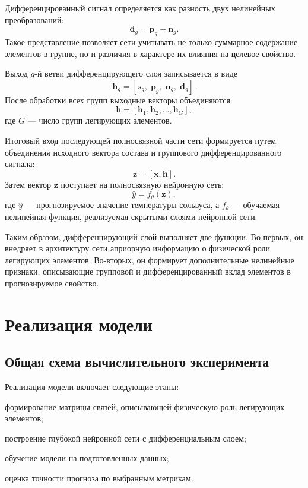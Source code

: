 Дифференцированный сигнал определяется как разность двух нелинейных
преобразований:
$$\mathbf{d}_g =\mathbf{p}_g - \mathbf{n}_g.$$
Такое представление позволяет сети учитывать не только суммарное
содержание элементов в группе, но и различия в характере их влияния на
целевое свойство.

Выход $g$-й ветви дифференцирующего слоя записывается в виде
$$\mathbf{h}_g =\left[s_g,\;\mathbf{p}_g,\;\mathbf{n}_g,\;\mathbf{d}_g\right].$$
После обработки всех групп выходные векторы объединяются:
$$\mathbf{h} =\left[\mathbf{h}_1,\mathbf{h}_2,\ldots,\mathbf{h}_G\right],$$
где $G$ — число групп легирующих элементов.

Итоговый вход последующей полносвязной части сети формируется путем
объединения исходного вектора состава и группового дифференцированного
сигнала:
$$\mathbf{z} = \left[\mathbf{x},\mathbf{h}\right].$$
Затем вектор $\mathbf{z}$ поступает на полносвязную нейронную сеть:
$$\hat{y}=f_{\theta}(\mathbf{z}),$$
где $\hat{y}$ — прогнозируемое значение температуры сольвуса, а
$f_{\theta}$ — обучаемая нелинейная функция, реализуемая скрытыми
слоями нейронной сети.

Таким образом, дифференцирующий слой выполняет две функции. Во-первых,
он внедряет в архитектуру сети априорную информацию о физической роли
легирующих элементов. Во-вторых, он формирует дополнительные нелинейные
признаки, описывающие групповой и дифференцированный вклад элементов в
прогнозируемое свойство.

\section{Реализация модели}

\subsection{Общая схема вычислительного эксперимента}

Реализация модели включает следующие этапы:

\begin{enumeratePaper}
    \item формирование матрицы связей, описывающей физическую роль 
    легирующих элементов;
    \item построение глубокой нейронной сети с дифференциальным слоем;
    \item обучение модели на подготовленных данных;
    \item оценка точности прогноза по выбранным метрикам.
\end{enumeratePaper}

